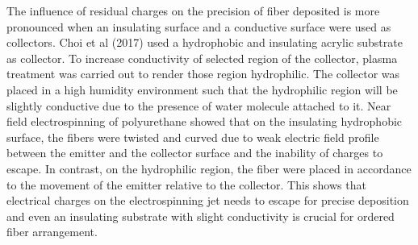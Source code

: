\documentclass[3p,,preprint,12pt]{elsarticle}
\begin{document}
The influence of residual charges on the precision of fiber deposited is more pronounced when an insulating surface and a conductive surface were used as collectors. Choi et al (2017) used a hydrophobic and insulating acrylic substrate as collector. To increase conductivity of selected region of the collector, plasma treatment was carried out to render those region hydrophilic. The collector was placed in a high humidity environment such that the hydrophilic region will be slightly conductive due to the presence of water molecule attached to it. Near field electrospinning of polyurethane showed that on the insulating hydrophobic surface, the fibers were twisted and curved due to weak electric field profile between the emitter and the collector surface and the inability of charges to escape. In contrast, on the hydrophilic region, the fiber were placed in accordance to the movement of the emitter relative to the collector. This shows that electrical charges on the electrospinning jet needs to escape for precise deposition and even an insulating substrate with slight conductivity is crucial for ordered fiber arrangement.
\end{document}
